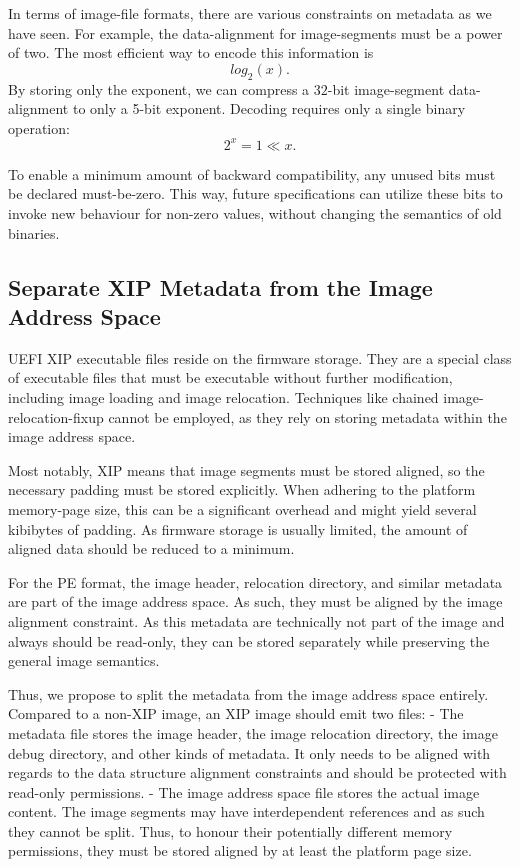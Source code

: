 In terms of \gls{image-file} formats, there are various constraints on metadata as we have seen. For example, the \gls{data-alignment} for \glspl{image-segment} must be a power of two. The most efficient way to encode this information is
\[ log_2(x). \]
By storing only the exponent, we can compress a $32$-bit \gls{image-segment} \gls{data-alignment} to only a 5-bit exponent. Decoding requires only a single binary operation:
\[ 2^x = 1 \ll x. \]

To enable a minimum amount of backward compatibility, any unused bits must be declared must-be-zero. This way, future specifications can utilize these bits to invoke new behaviour for non-zero values, without changing the semantics of old binaries.

\subsection{Separate XIP Metadata from the Image Address Space}
\label{sec:ue_xip}

UEFI XIP executable files reside on the firmware storage. They are a special class of executable files that must be executable without further modification, including image loading and image relocation. Techniques like chained \gls{image-relocation-fixup} cannot be employed, as they rely on storing metadata within the image address space.

Most notably, XIP means that image segments must be stored aligned, so the necessary padding must be stored explicitly. When adhering to the platform \gls{memory-page} size, this can be a significant overhead and might yield several kibibytes of padding. As firmware storage is usually limited, the amount of aligned data should be reduced to a minimum.

For the PE format, the image header, relocation directory, and similar metadata are part of the image address space. As such, they must be aligned by the image alignment constraint. As this metadata are technically not part of the image and always should be read-only, they can be stored separately while preserving the general image semantics.

Thus, we propose to split the metadata from the image address space entirely. Compared to a non-XIP image, an XIP image should emit two files:
- The metadata file stores the image header, the image relocation directory, the image debug directory, and other kinds of metadata. It only needs to be aligned with regards to the data structure alignment constraints and should be protected with read-only permissions.
- The image address space file stores the actual image content. The image segments may have interdependent references and as such they cannot be split. Thus, to honour their potentially different memory permissions, they must be stored aligned by at least the platform page size.

